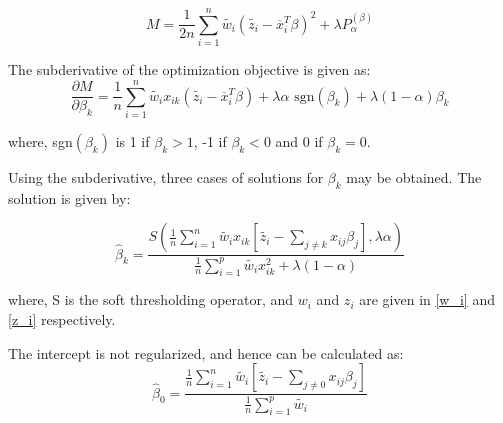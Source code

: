 \documentclass[12pt,a4paper]{report}
\begin{document}
\begin{equation} \label{z_i}
  M = \frac{1}{2n}\sum_{i=1}^n \widetilde{w_i} (\widetilde{z_i} - \overline x_i^T \beta)^2 
    + \lambda P_{\alpha}^(\beta)
\end{equation}

The subderivative of the optimization objective is given as:
\begin{equation}
\frac{ \partial M}{\partial \beta_k} = \frac{1}{n}\sum_{i=1}^n \widetilde{w_i} x_{ik} (\widetilde{ z_i} - \overline x_i^T \beta ) + \lambda \alpha \mbox{ sgn}(\beta_k) + \lambda (1-\alpha)\beta_k
\end{equation}

where, sgn$(\beta_k)$ is 1 if $\beta_k > 1$, -1 if $\beta_k<0$ and 0 if $\beta_k = 0$.

Using the subderivative, three cases of solutions for $\beta_k$ may be obtained. The solution is given by:

\begin{equation} \label{beta}
\hat \beta_k = \frac{S\left(\frac{1}{n} \sum_{i=1}^n \widetilde{w_i} x_{ik} \left[\widetilde{ z_i} - \sum_{j \ne k} x_{ij} \beta_j \right], \lambda \alpha \right)}
					{\frac{1}{n} \sum_{i=1}^p \widetilde{w_i} x_{ik}^2 + \lambda (1- \alpha)}
\end{equation}

where, S is the soft thresholding operator, and $w_i$ and $z_i$ are given in \ref{w_i} and \ref{z_i} respectively.

The intercept is not regularized, and hence can be calculated as:
\begin{equation} \label{intercept}
\hat \beta_0 = \frac{\frac{1}{n} \sum_{i=1}^n \widetilde{w_i} \left[\widetilde{ z_i} - \sum_{j \ne 0} x_{ij} \beta_j \right]}
					{\frac{1}{n} \sum_{i=1}^p \widetilde{w_i}}
\end{equation}
\end{document}
